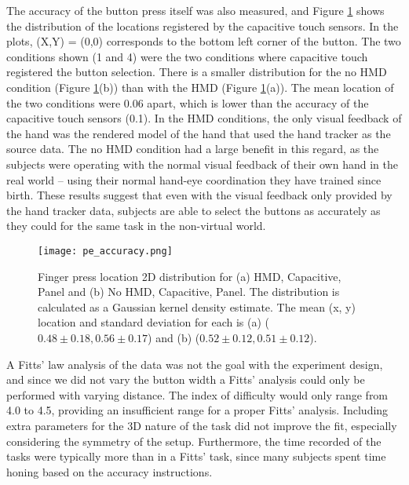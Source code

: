 The accuracy of the button press itself was also measured, and Figure \ref{fig:pe_accuracy} shows the distribution of the locations registered by the capacitive touch sensors.
In the plots, (X,Y) = (0,0) corresponds to the bottom left corner of the button.
The two conditions shown (1 and 4) were the two conditions where capacitive touch registered the button selection.
There is a smaller distribution for the no HMD condition (Figure \ref{fig:pe_accuracy}(b)) than with the HMD (Figure \ref{fig:pe_accuracy}(a)).
The mean location of the two conditions were \SI{0.06}{\inch} apart, which is lower than the accuracy of the capacitive touch sensors (\SI{0.1}{\inch}).
In the HMD conditions, the only visual feedback of the hand was the rendered model of the hand that used the hand tracker as the source data.
The no HMD condition had a large benefit in this regard, as the subjects were operating with the normal visual feedback of their own hand in the real world -- using their normal hand-eye coordination they have trained since birth.
These results suggest that even with the visual feedback only provided by the hand tracker data, subjects are able to select the buttons as accurately as they could for the same task in the non-virtual world.

\begin{figure}
    \centering
    \texttt{[image: pe\_accuracy.png]}
    \caption{Finger press location 2D distribution for (a) HMD, Capacitive, Panel and (b) No HMD, Capacitive, Panel. The distribution is calculated as a Gaussian kernel density estimate. The mean (x, y) location and standard deviation for each is (a) ($0.48\pm0.18, 0.56\pm0.17$) and (b) ($0.52\pm0.12, 0.51\pm0.12$).}
    \label{fig:pe_accuracy}
\end{figure}

A Fitts’ law analysis of the data was not the goal with the experiment design, and since we did not vary the button width a Fitts’ analysis could only be performed with varying distance.
The index of difficulty would only range from 4.0 to 4.5, providing an insufficient range for a proper Fitts’ analysis.
Including extra parameters for the 3D nature of the task \citep{murata_extending_2001, cha_extended_2013} did not improve the fit, especially considering the symmetry of the setup.
Furthermore, the time recorded of the tasks were typically more than in a Fitts' task, since many subjects spent time honing based on the accuracy instructions.


